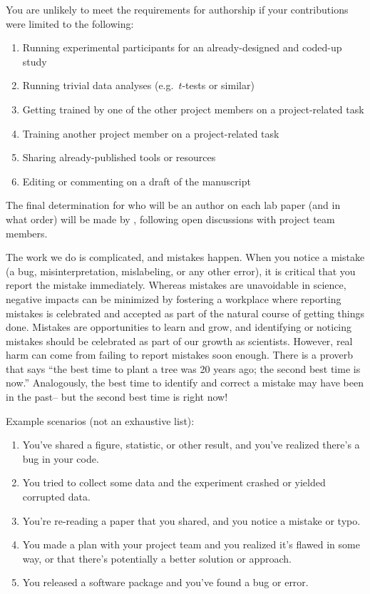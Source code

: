 \documentclass{tufte-book} %
\begin{document}
You are unlikely to meet the requirements for authorship if your
contributions were limited to the following:
\begin{enumerate}
  \item Running experimental participants for an already-designed and
    coded-up study
  \item Running trivial data analyses (e.g.\ $t$-tests or similar)
  \item Getting trained by one of the other project members on a
    project-related task
  \item Training another project member on a project-related task
  \item Sharing already-published tools or resources
  \item Editing or commenting on a draft of the manuscript
\end{enumerate}

The final determination for who will be an author on each lab paper
(and in what order) will be made by \director, following open
discussions with project team members.


\noindent The work we do is complicated, and mistakes happen.  When
you notice a mistake (a bug, misinterpretation, mislabeling, or any
other error), it is critical that you report the mistake immediately.
Whereas mistakes are unavoidable in science, negative impacts can be
minimized by fostering a workplace where reporting mistakes is
celebrated and accepted as part of the natural course of getting
things done.  Mistakes are opportunities to learn and grow, and
identifying or noticing mistakes should be celebrated as part of our
growth as scientists.  However, real harm can come from failing to
report mistakes soon enough.  There is a proverb that says
``the best time to plant a tree was 20 years ago; the second best time
is now.''  Analogously, the best time to identify and correct a
mistake may have been in the past-- but the second best time is right now!

Example scenarios (not an exhaustive list):
\begin{enumerate}
  \item You've shared a figure, statistic, or other result, and
    you've realized there's a bug in your code.
  \item You tried to collect some data and the experiment crashed or
    yielded corrupted data.
  \item You're re-reading a paper that you shared, and you notice a
    mistake or typo.
  \item You made a plan with your project team and you realized it's
    flawed in some way, or that there's potentially a better solution
    or approach.
  \item You released a software package and you've found a bug or error.
\end{enumerate}
\end{document}
